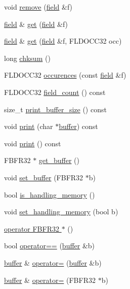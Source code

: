 \begin{DoxyCompactItemize}
\item 
void \hyperlink{classatmi_1_1buffer_a4a1ef484befbf22aca919fc1a312ab61}{remove} (\hyperlink{classatmi_1_1field}{field} \&f)
\item 
\hyperlink{classatmi_1_1field}{field} \& \hyperlink{classatmi_1_1buffer_affb14c05bc21e29c3a2f6dc03c30c0fa}{get} (\hyperlink{classatmi_1_1field}{field} \&f)
\item 
\hyperlink{classatmi_1_1field}{field} \& \hyperlink{classatmi_1_1buffer_a864adb4d0153e6be38a7905c994915e1}{get} (\hyperlink{classatmi_1_1field}{field} \&f, F\+L\+D\+O\+C\+C32 occ)
\item 
long \hyperlink{classatmi_1_1buffer_a4ae9fa419098eb136ae3681ad90ccafb}{chksum} ()
\item 
F\+L\+D\+O\+C\+C32 \hyperlink{classatmi_1_1buffer_a57ff1b2ed449d59d4ec936e9e79a5d1a}{occurences} (const \hyperlink{classatmi_1_1field}{field} \&f)
\item 
F\+L\+D\+O\+C\+C32 \hyperlink{classatmi_1_1buffer_a74a6ff6ab31eb1128fc2f40d2a8e020f}{field\+\_\+count} () const 
\item 
size\+\_\+t \hyperlink{classatmi_1_1buffer_ae315c028b78f321abce6d9be2e026813}{print\+\_\+buffer\+\_\+size} () const 
\item 
void \hyperlink{classatmi_1_1buffer_ad7b1a3f9005926e07d00393aa6300f39}{print} (char $\ast$\hyperlink{classatmi_1_1buffer}{buffer}) const 
\item 
void \hyperlink{classatmi_1_1buffer_aa5f087559f5f3fb4f383121f78f2c461}{print} () const 
\item 
F\+B\+F\+R32 $\ast$ \hyperlink{classatmi_1_1buffer_aa9aa5382717ed17a2047db2779f8f0ec}{get\+\_\+buffer} ()
\item 
void \hyperlink{classatmi_1_1buffer_ade8853e7c2ae10dcd024b34049e99af3}{set\+\_\+buffer} (F\+B\+F\+R32 $\ast$b)
\item 
bool \hyperlink{classatmi_1_1buffer_aae543cf7816b338d20031993c18ce491}{is\+\_\+handling\+\_\+memory} ()
\item 
void \hyperlink{classatmi_1_1buffer_a68f05d1dbd040062850feeba5aa188fc}{set\+\_\+handling\+\_\+memory} (bool b)
\item 
\hyperlink{classatmi_1_1buffer_a79e82bc3f9dac86efc685604c20ed78d}{operator F\+B\+F\+R32 $\ast$} ()
\item 
bool \hyperlink{classatmi_1_1buffer_aa095219e6aa1470c96dc2b3d4ddeeb98}{operator==} (\hyperlink{classatmi_1_1buffer}{buffer} \&b)
\item 
\hyperlink{classatmi_1_1buffer}{buffer} \& \hyperlink{classatmi_1_1buffer_a878220e2ba9a66a991c77b20fd52ff09}{operator=} (\hyperlink{classatmi_1_1buffer}{buffer} \&b)
\item 
\hyperlink{classatmi_1_1buffer}{buffer} \& \hyperlink{classatmi_1_1buffer_a4efc77b0773f85c06d391af8a7ebe98a}{operator=} (F\+B\+F\+R32 $\ast$b)
\end{DoxyCompactItemize}
